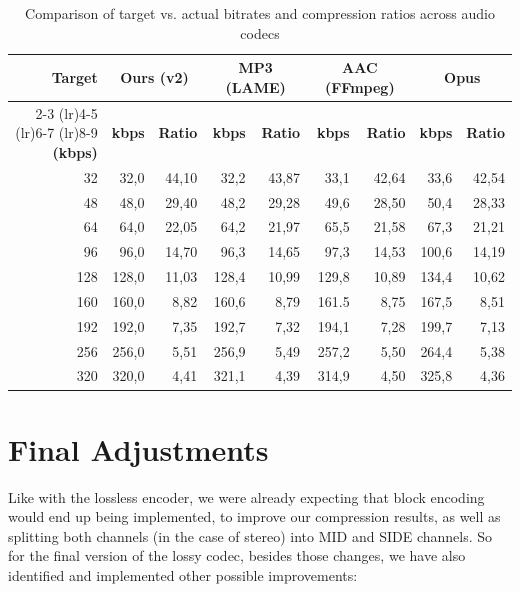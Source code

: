\begin{table}[htbp]
    \centering
    \caption{Comparison of target vs. actual bitrates and compression ratios across audio codecs}
    \label{tab:lossy_codec_comparison}
    \small
    \begin{tabular}{rrrrrrrrr}
        \toprule
        \textbf{Target} &
        \multicolumn{2}{c}{\textbf{Ours (v2)}} &
        \multicolumn{2}{c}{\textbf{MP3 (LAME)}} &
        \multicolumn{2}{c}{\textbf{AAC (FFmpeg)}} &
        \multicolumn{2}{c}{\textbf{Opus}} \\
        \cmidrule(lr){2-3} \cmidrule(lr){4-5} \cmidrule(lr){6-7} \cmidrule(lr){8-9}
        \textbf{(kbps)} &
        \textbf{kbps} & \textbf{Ratio} &
        \textbf{kbps} & \textbf{Ratio} &
        \textbf{kbps} & \textbf{Ratio} &
        \textbf{kbps} & \textbf{Ratio} \\
        \midrule
        32 & 32,0 & 44,10 & 32,2 & 43,87 & 33,1 & 42,64 & 33,6 & 42,54 \\
        48 & 48,0 & 29,40 & 48,2 & 29,28 & 49,6 & 28,50 & 50,4 & 28,33 \\
        64 & 64,0 & 22,05 & 64,2 & 21,97 & 65,5 & 21,58 & 67,3 & 21,21 \\
        96 & 96,0 & 14,70 & 96,3 & 14,65 & 97,3 & 14,53 & 100,6 & 14,19 \\
        128 & 128,0 & 11,03 & 128,4 & 10,99 & 129,8 & 10,89 & 134,4 & 10,62 \\
        160 & 160,0 & 8,82 & 160,6 & 8,79 & 161.5 & 8,75 & 167,5 & 8,51 \\
        192 & 192,0 & 7,35 & 192,7 & 7,32 & 194,1 & 7,28 & 199,7 & 7,13 \\
        256 & 256,0 & 5,51 & 256,9 & 5,49 & 257,2 & 5,50 & 264,4 & 5,38 \\
        320 & 320,0 & 4,41 & 321,1 & 4,39 & 314,9 & 4,50 & 325,8 & 4,36 \\
        \bottomrule
    \end{tabular}
\end{table}

\vspace{40pt}
\section{Final Adjustments}

Like with the lossless encoder, we were already expecting that block encoding would end up being implemented, to improve our compression results, as well as splitting both channels (in the case of stereo) into MID and SIDE channels. So for the final version of the lossy codec, besides those changes, we have also identified and implemented other possible improvements:

